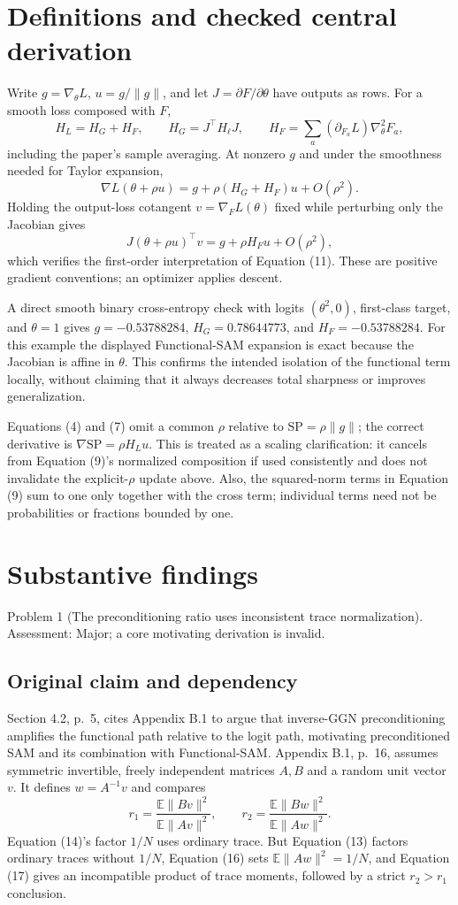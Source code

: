 \documentclass[10pt]{article}
\begin{document}
\section*{Definitions and checked central derivation}
Write \(g=\nabla_\theta L\), \(u=g/\|g\|\), and let \(J=\partial F/\partial\theta\) have outputs as rows. For a smooth loss composed with \(F\), \[H_L=H_G+H_F,\qquad
 H_G=J^\top H_\ell J,\qquad
 H_F=\sum_a(\partial_{F_a}L)\nabla_\theta^2F_a,\] including the paper’s sample averaging. At nonzero \(g\) and under the smoothness needed for Taylor expansion, \[\nabla L(\theta+\rho u)
 =g+\rho(H_G+H_F)u+O(\rho^2).\] Holding the output-loss cotangent \(v=\nabla_F L(\theta)\) fixed while perturbing only the Jacobian gives \[J(\theta+\rho u)^\top v
 =g+\rho H_Fu+O(\rho^2),\] which verifies the first-order interpretation of Equation (11). These are positive gradient conventions; an optimizer applies descent.\par
A direct smooth binary cross-entropy check with logits \((\theta^2,0)\), first-class target, and \(\theta=1\) gives \(g=-0.53788284\), \(H_G=0.78644773\), and \(H_F=-0.53788284\). For this example the displayed Functional-SAM expansion is exact because the Jacobian is affine in \(\theta\). This confirms the intended isolation of the functional term locally, without claiming that it always decreases total sharpness or improves generalization.\par
Equations (4) and (7) omit a common \(\rho\) relative to \(\mathrm{SP}=\rho\|g\|\); the correct derivative is \(\nabla\mathrm{SP}=\rho H_Lu\). This is treated as a scaling clarification: it cancels from Equation (9)’s normalized composition if used consistently and does not invalidate the explicit-\(\rho\) update above. Also, the squared-norm terms in Equation (9) sum to one only together with the cross term; individual terms need not be probabilities or fractions bounded by one.\par
\section*{Substantive findings}
Problem 1 (The preconditioning ratio uses inconsistent trace normalization).  Assessment: Major; a core motivating derivation is invalid.\par
\subsection*{Original claim and dependency}
Section 4.2, p. 5, cites Appendix B.1 to argue that inverse-GGN preconditioning amplifies the functional path relative to the logit path, motivating preconditioned SAM and its combination with Functional-SAM. Appendix B.1, p. 16, assumes symmetric invertible, freely independent matrices \(A,B\) and a random unit vector \(v\). It defines \(w=A^{-1}v\) and compares \[r_1=\frac{\mathbb E\|Bv\|^2}{\mathbb E\|Av\|^2},
 \qquad
 r_2=\frac{\mathbb E\|Bw\|^2}{\mathbb E\|Aw\|^2}.\] Equation (14)’s factor \(1/N\) uses ordinary trace. But Equation (13) factors ordinary traces without \(1/N\), Equation (16) sets \(\mathbb E\|Aw\|^2=1/N\), and Equation (17) gives an incompatible product of trace moments, followed by a strict \(r_2>r_1\) conclusion.\par
\end{document}
